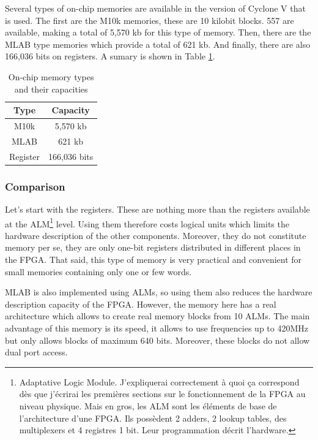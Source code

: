 \documentclass[12pt]{article}
\begin{document}
Several types of on-chip memories are available in the version of Cyclone V that is used. The first are the M10k memories, these are 10 kilobit blocks. 557 are available, making a total of 5,570 kb for this type of memory. Then, there are the MLAB type memories which provide a total of 621 kb. And finally, there are also 166,036 bits on registers. A sumary is shown in Table \ref{tab:memory}.

\begin{table}[h!]
  \centering
  \begin{tabular}{|c|c|}
    \hline
    \textbf{Type} & \textbf{Capacity} \\
    \hline
    M10k & 5,570 kb \\
    MLAB & 621 kb \\
    Register & 166,036 bits \\
    \hline
  \end{tabular}
\caption{On-chip memory types and their capacities}
\label{tab:memory}
\end{table}

\subsubsection{Comparison}

Let's start with the registers. These are nothing more than the registers available at the ALM\footnote{Adaptative Logic Module. J'expliquerai correctement à quoi ça correspond dès que j'écrirai les premières sections sur le fonctionnement de la FPGA au niveau physique. Mais en gros, les ALM sont les éléments de base de l'architecture d'une FPGA. Ils possèdent 2 adders, 2 lookup tables, des multiplexers et 4 registres 1 bit. Leur programmation décrit l'hardware.} level. Using them therefore costs logical units which limits the hardware description of the other components. Moreover, they do not constitute memory per se, they are only one-bit registers distributed in different places in the FPGA. That said, this type of memory is very practical and convenient for small memories containing only one or few words.

\vspace{12pt}
MLAB is also implemented using ALMs, so using them also reduces the hardware description capacity of the FPGA. However, the memory here has a real architecture which allows to create real memory blocks from 10 ALMs. The main advantage of this memory is its speed, it allows to use frequencies up to 420MHz but only allows blocks of maximum 640 bits. Moreover, these blocks do not allow dual port access.
\end{document}
